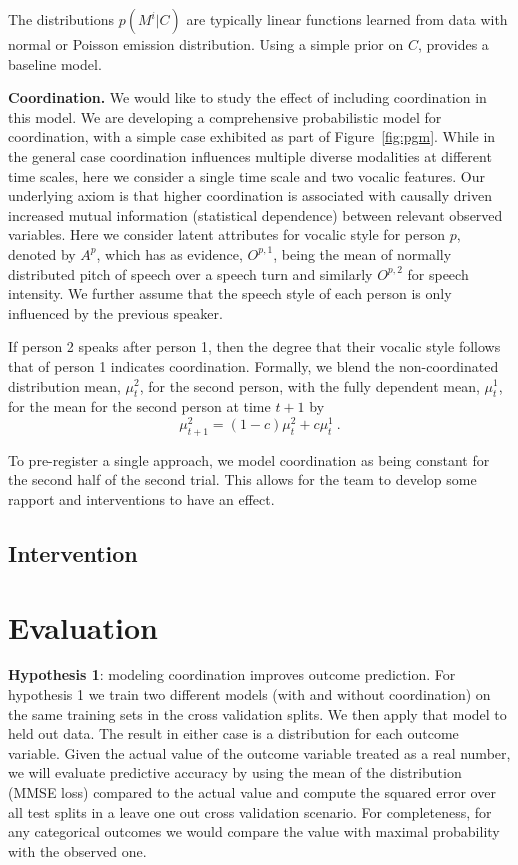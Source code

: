 %
    The distributions $p(M^i|C)$ are typically linear functions learned from data
    with normal or Poisson emission distribution. Using a simple prior on $C$,
    provides a baseline model.

    \textbf{Coordination.}
    We would like to study the effect of including coordination in this model.
    We are developing a comprehensive probabilistic model for coordination, with
    a simple case exhibited as part of Figure~\ref{fig:pgm}.  While in the
    general case coordination influences multiple diverse modalities at
    different time scales, here we consider a single time scale and two vocalic
    features.  Our underlying axiom is that higher coordination is associated
    with causally driven increased mutual information (statistical dependence)
    between relevant observed variables. Here we consider latent attributes for
    vocalic style for person $p$, denoted by $A^{p}$, which has as evidence,
    $O^{p,1}$, being the mean of normally distributed pitch of speech over a
    speech turn and similarly $O^{p,2}$ for speech intensity.  We further assume
    that the speech style of each person is only influenced by the previous
    speaker.

    If person 2 speaks after
    person 1, then the degree that their vocalic style follows that of person 1
    indicates coordination. Formally, we blend the non-coordinated distribution
    mean, $\mu^2_t$, for the second person, with the fully dependent mean,
    $\mu^1_t$, for the mean for the second person at time $t+1$ by
    \begin{equation}
    \mu^2_{t+1} = (1-c) \mu^2_t + c\mu^1_t ~.
    \end{equation}

    To pre-register a single approach, we model coordination as being
    constant for the second half of the second
    trial. This allows for the team to develop some rapport and interventions to
    have an effect. 

\subsection{Intervention}





\section{Evaluation}

\textbf{Hypothesis 1}: modeling coordination improves outcome prediction.  For
hypothesis 1 we train two different models (with and without coordination) on
the same training sets in the cross validation splits. We then apply that model
to held out data. The result in either case is a distribution for each outcome
variable. Given the actual value of the outcome variable treated as a real
number, we will evaluate predictive accuracy by using the mean of the
distribution (MMSE loss) compared to the actual value and compute the squared
error over all test splits in a leave one out cross validation scenario. For
completeness, for any categorical outcomes we would compare the value with
maximal probability with the observed one. 

